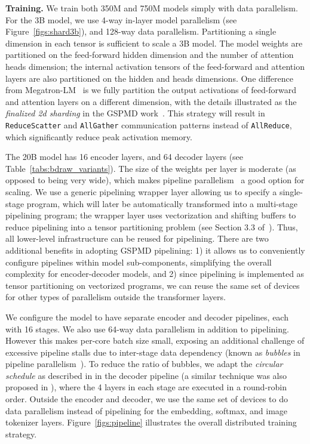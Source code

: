 \textbf{Training.}
We train both 350M and 750M models simply with data parallelism. For the 3B model, we use 4-way in-layer model parallelism (see Figure~\ref{figs:shard3b}), and 128-way data parallelism. Partitioning a single dimension in each tensor is sufficient to scale a 3B model. The model weights are partitioned on the feed-forward hidden dimension and the number of attention heads dimension; the internal activation tensors of the feed-forward and attention layers are also partitioned on the hidden and heads dimensions. One difference from Megatron-LM~\cite{megatron} is we fully partition the output activations of feed-forward and attention layers on a different dimension, with the details illustrated as the \emph{finalized 2d sharding} in the GSPMD work~\cite{xu2021gspmd}. This strategy will result in \texttt{ReduceScatter} and \texttt{AllGather} communication patterns instead of \texttt{AllReduce}, which significantly reduce peak activation memory.

The 20B model has 16 encoder layers, and 64 decoder layers (see Table~\ref{tabs:bdraw_variants}). The size of the weights per layer is moderate (as opposed to being very wide), which makes pipeline parallelism~\cite{gpipe} a good option for scaling. We use a generic pipelining wrapper layer allowing us to specify a single-stage program, which will later be automatically transformed into a multi-stage pipelining program; the wrapper layer uses vectorization and shifting buffers to reduce pipelining into a tensor partitioning problem (see Section 3.3 of~\cite{xu2021gspmd}). Thus, all lower-level infrastructure can be reused for pipelining. There are two additional benefits in adopting GSPMD pipelining: 1) it allows us to conveniently configure pipelines within model sub-components, simplifying the overall complexity for encoder-decoder models, and 2) since pipelining is implemented as tensor partitioning on vectorized programs, we can reuse the same set of devices for other types of parallelism outside the transformer layers.

We configure the model to have separate encoder and decoder pipelines, each with 16 stages. We also use 64-way data parallelism in addition to pipelining. However this makes per-core batch size small, exposing an additional challenge of excessive pipeline stalls due to inter-stage data dependency (known as \textit{bubbles} in pipeline parallelism~\cite{gpipe}). To reduce the ratio of bubbles, we adapt the \emph{circular schedule} as described in \cite{xu2021gspmd} in the decoder pipeline (a similar technique was also proposed in \cite{megatron21}), where the 4 layers in each stage are executed in a round-robin order. Outside the encoder and decoder, we use the same set of devices to do data parallelism instead of pipelining for the embedding, softmax, and image tokenizer layers. Figure~\ref{figs:pipeline} illustrates the overall distributed training strategy.

